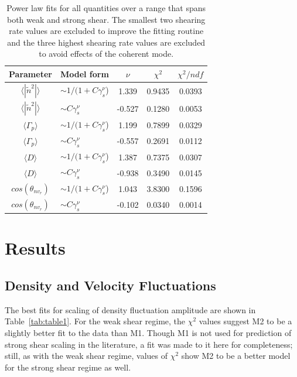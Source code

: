 \documentclass[aip,pop,amsmath,amssymb,peprint,superscriptaddress]{revtex4-1} %
\begin{document}
\begin{table}
\caption{\label{tab:table7}Power law fits for all quantities over a
  range that spans both weak and strong shear. The smallest two
  shearing rate values are excluded to improve the fitting routine and
  the three highest shearing rate values are excluded to avoid effects of the coherent mode.}
\begin{ruledtabular}
\begin{tabular}{clccc}
Parameter&Model form&$\nu$&$\chi^2$&$\chi^2/ndf$\\
\hline
$\langle |\tilde{n}^{2}|\rangle$     & $\sim 1/(1+C\gamma_{s}^\nu$) &1.339   &0.9435    &0.0393\\
$\langle |\tilde{n}^{2}|\rangle$     & $\sim C\gamma_{s}^\nu$ &-0.527   &0.1280    &0.0053\\
$\langle \Gamma_{p}\rangle$          & $\sim 1/(1+C\gamma_{s}^\nu$) &1.199   &0.7899    &0.0329\\
$\langle \Gamma_{p}\rangle$          & $\sim C\gamma_{s}^\nu$ &-0.557   &0.2691    &0.0112\\
$\langle D\rangle$                   & $\sim 1/(1+C\gamma_{s}^\nu$) &1.387   &0.7375    &0.0307\\
$\langle D\rangle$                   & $\sim C\gamma_{s}^\nu$ &-0.938   &0.3490    &0.0145\\
$cos(\theta_{nv_{r}})$               & $\sim 1/(1+C\gamma_{s}^\nu$) &1.043   &3.8300    &0.1596\\
$cos(\theta_{nv_{r}})$               & $\sim C\gamma_{s}^\nu$ &-0.102   &0.0340    &0.0014\\

\end{tabular}
\end{ruledtabular}
\end{table}

\section{Results}

\subsection{Density and Velocity Fluctuations}

The best fits for scaling of density fluctuation amplitude are shown in Table~\ref{tab:table1}. For the weak shear regime, the $\chi^{2}$ values suggest M2 to be a slightly better fit to the data than M1. Though M1 is not used for prediction of strong shear scaling in the literature, a fit was made to it here for completeness; still, as with the weak shear regime, values of $\chi^{2}$ show M2 to be a better model for the strong shear regime as well.
\end{document}

